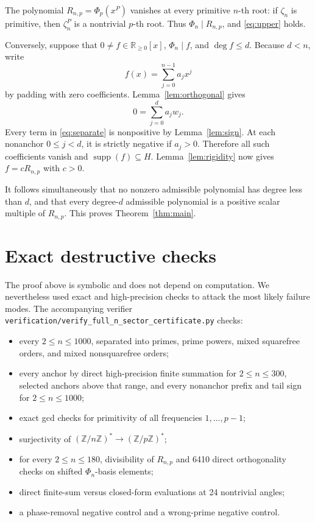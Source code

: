 \documentclass[11pt]{article}
\numberwithin{equation}{section}
\begin{document}
The polynomial $R_{n,p}=\Phi_p(x^P)$ vanishes at every primitive $n$-th
root: if $\zeta_n$ is primitive, then $\zeta_n^P$ is a nontrivial $p$-th
root. Thus $\Phi_n\mid R_{n,p}$, and \eqref{eq:upper} holds.

Conversely, suppose that $0\ne f\in\mathbb R_{\geq0}[x]$,
$\Phi_n\mid f$, and $\deg f\leq d$. Because $d<n$, write
\[
f(x)=\sum_{j=0}^{n-1}a_jx^j
\]
by padding with zero coefficients. Lemma~\ref{lem:orthogonal} gives
\begin{equation}
0=\sum_{j=0}^{d}a_jw_j.
\label{eq:separate}
\end{equation}
Every term in \eqref{eq:separate} is nonpositive by Lemma~\ref{lem:sign}.
At each nonanchor $0\leq j<d$, it is strictly negative if $a_j>0$.
Therefore all such coefficients vanish and
$\operatorname{supp}(f)\subseteq H$. Lemma~\ref{lem:rigidity} now gives
$f=cR_{n,p}$ with $c>0$.

It follows simultaneously that no nonzero admissible polynomial has degree
less than $d$, and that every degree-$d$ admissible polynomial is a positive
scalar multiple of $R_{n,p}$. This proves Theorem~\ref{thm:main}.

\section{Exact destructive checks}\label{sec:checks}

The proof above is symbolic and does not depend on computation. We nevertheless
used exact and high-precision checks to attack the most likely failure modes.
The accompanying verifier
\texttt{verification/verify\_full\_n\_sector\_certificate.py} checks:
\begin{itemize}
\item every $2\leq n\leq1000$, separated into primes, prime powers, mixed
  squarefree orders, and mixed nonsquarefree orders;
\item every anchor by direct high-precision finite summation for
  $2\leq n\leq300$, selected anchors above that range, and every nonanchor
  prefix and tail sign for $2\leq n\leq1000$;
\item exact gcd checks for primitivity of all frequencies $1,\ldots,p-1$;
\item surjectivity of
  $(\mathbb Z/n\mathbb Z)^*\to(\mathbb Z/p\mathbb Z)^*$;
\item for every $2\leq n\leq180$, divisibility of $R_{n,p}$ and 6410
  direct orthogonality checks on shifted $\Phi_n$-basis elements;
\item direct finite-sum versus closed-form evaluations at 24 nontrivial angles;
\item a phase-removal negative control and a wrong-prime negative control.
\end{itemize}
\end{document}
